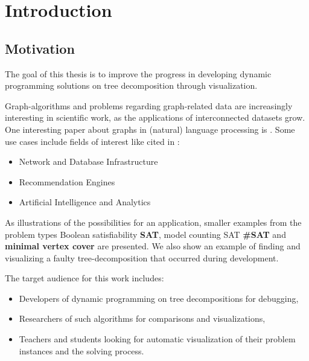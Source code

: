 \documentclass[a4paper, 12pt, bibliography=totoc]{scrartcl}
\begin{document}
\section{Introduction}
\subsection{Motivation}

The goal of this thesis is to improve the progress in developing dynamic programming solutions on tree decomposition through visualization.

Graph-algorithms and problems regarding graph-related data are increasingly interesting in scientific work, as the applications of interconnected datasets grow. One interesting paper about graphs in (natural) language processing is \cite{jones-etal-2013-modeling}.
Some use cases include fields of interest like cited in \cite{graphUseCases}: %
\begin{itemize}
	\item Network and Database Infrastructure
	\item Recommendation Engines
	\item Artificial Intelligence and Analytics
\end{itemize}

As illustrations of the possibilities for an application, smaller examples from the problem types Boolean satisfiability \textbf{SAT}, model counting SAT \textbf{\#SAT} and \textbf{minimal vertex cover} are presented.
We also show an example of finding  and visualizing a faulty tree-decomposition that occurred during development.


The target audience for this work includes: 
\begin{itemize}
	\item Developers of dynamic programming on tree decompositions for debugging,
	\item Researchers of such algorithms for comparisons and visualizations,
	\item Teachers and students looking for automatic visualization of their problem instances and the solving process.
\end{itemize} 
\end{document}
